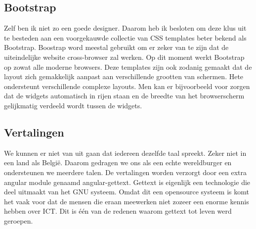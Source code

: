 \documentclass[a4paper,11pt]{article}
\begin{document}
\subsection{Bootstrap}
Zelf ben ik niet zo een goede designer. Daarom heb ik besloten om deze klus uit te besteden aan een voorgekauwde collectie van CSS templates beter bekend als Bootstrap. Boostrap word meestal gebruikt om er zeker van te zijn dat de uiteindelijke website cross-browser zal werken. Op dit moment werkt Bootstrap op zowat alle moderne browsers. Deze templates zijn ook zodanig gemaakt dat de layout zich gemakkelijk aanpast aan verschillende grootten van schermen. Hete ondersteunt verschillende complexe layouts. Men kan er bijvoorbeeld voor zorgen dat de widgets automatisch in rijen staan en de breedte van het browserscherm gelijkmatig verdeeld wordt tussen de widgets.

\subsection{Vertalingen}
We kunnen er niet van uit gaan dat iedereen dezelfde taal spreekt. Zeker niet in een land als België. Daarom gedragen we ons als een echte wereldburger en ondersteunen we meerdere talen. De vertalingen worden verzorgt door een extra angular module genaamd angular-gettext. Gettext is eigenlijk een technologie die deel uitmaakt van het GNU systeem. Omdat dit een opensource systeem is komt het vaak voor dat de mensen die eraan meewerken niet zozeer een enorme kennis hebben over ICT. Dit is één van de redenen waarom gettext tot leven werd geroepen.
\end{document}
